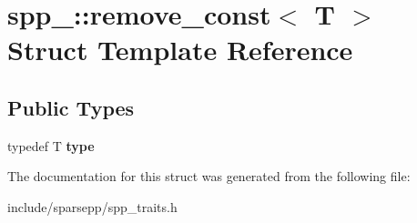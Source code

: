 \hypertarget{structspp___1_1remove__const}{}\section{spp\+\_\+\+:\+:remove\+\_\+const$<$ T $>$ Struct Template Reference}
\label{structspp___1_1remove__const}
\subsection*{Public Types}
\begin{DoxyCompactItemize}
\item 
typedef T {\bfseries type}\hypertarget{structspp___1_1remove__const_abbb860691b2ecd344f2a4fca9518d583}{}\label{structspp___1_1remove__const_abbb860691b2ecd344f2a4fca9518d583}

\end{DoxyCompactItemize}


The documentation for this struct was generated from the following file\+:\begin{DoxyCompactItemize}
\item 
include/sparsepp/spp\+\_\+traits.\+h\end{DoxyCompactItemize}
